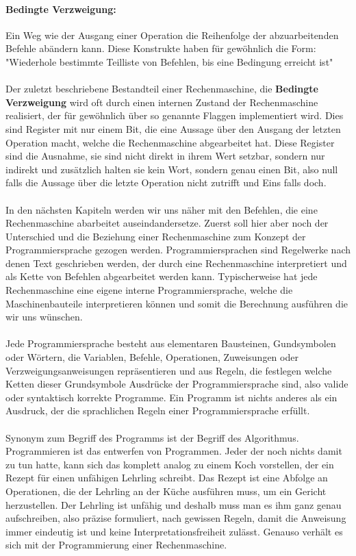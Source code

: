 \documentclass[11pt,a4paper,leqno]{report}
\numberwithin{equation}{chapter}
\begin{document}
\paragraph{Bedingte Verzweigung:} Ein Weg wie der Ausgang einer Operation die Reihenfolge der abzuarbeitenden Befehle ab\"andern kann. Diese Konstrukte haben f\"ur gew\"ohnlich die Form: "Wiederhole bestimmte Teilliste von Befehlen, bis eine Bedingung erreicht ist"
\\
\\
Der zuletzt beschriebene Bestandteil einer Rechenmaschine, die \textbf{Bedingte Verzweigung} wird oft durch einen internen Zustand der Rechenmaschine realisiert, der f\"ur gew\"ohnlich \"uber so genannte Flaggen implementiert wird. Dies sind Register mit nur einem Bit, die eine Aussage \"uber den Ausgang der letzten Operation macht, welche die Rechenmaschine abgearbeitet hat. Diese Register sind die Ausnahme, sie sind nicht direkt in ihrem Wert setzbar, sondern nur indirekt und zus\"atzlich halten sie kein Wort, sondern genau einen Bit, also null falls die Aussage \"uber die letzte Operation nicht zutrifft und Eins falls doch.\\
\\
In den n\"achsten Kapiteln werden wir uns n\"aher mit den Befehlen, die eine Rechenmaschine abarbeitet auseindandersetze. Zuerst soll hier aber noch der Unterschied und die Beziehung einer Rechenmaschine zum Konzept der Programmiersprache gezogen werden. Programmiersprachen sind Regelwerke nach denen  Text geschrieben werden, der durch eine Rechenmaschine interpretiert und als Kette von Befehlen abgearbeitet werden kann.
Typischerweise hat jede Rechenmaschine eine eigene interne Programmiersprache, welche die Maschinenbauteile interpretieren k\"onnen und somit die Berechnung ausf\"uhren die wir uns w\"unschen.\\
\\
Jede Programmiersprache besteht aus elementaren Bausteinen, Gundsymbolen oder W\"ortern, die Variablen, Befehle, Operationen, Zuweisungen oder\\ Verzweigungsanweisungen repr\"asentieren und aus Regeln, die festlegen welche Ketten dieser Grundsymbole Ausdr\"ucke der Programmiersprache sind, also valide oder syntaktisch korrekte Programme. Ein Programm ist nichts anderes als ein Ausdruck, der die sprachlichen Regeln einer Programmiersprache erf\"ullt.\\
\\
Synonym zum Begriff des Programms ist der Begriff des Algorithmus. \\
Programmieren ist das entwerfen von Programmen. Jeder der noch nichts damit zu tun hatte, kann sich das komplett analog zu einem Koch vorstellen, der ein Rezept f\"ur einen unf\"ahigen Lehrling schreibt. Das Rezept ist eine Abfolge an Operationen, die der Lehrling an der K\"uche ausf\"uhren muss, um ein Gericht herzustellen. Der Lehrling ist unf\"ahig und deshalb muss man es ihm ganz genau aufschreiben, also pr\"azise formuliert, nach gewissen Regeln, damit die Anweisung immer eindeutig ist und keine Interpretationsfreiheit zul\"asst. Genauso verh\"alt es sich mit der Programmierung einer Rechenmaschine.
\newpage
\end{document}
